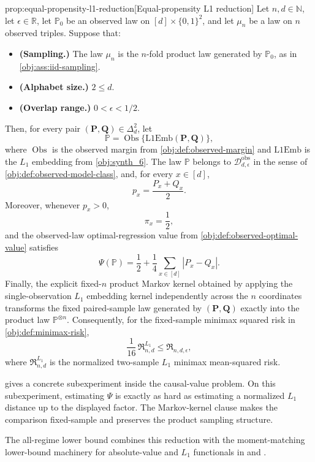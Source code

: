 \begin{propositionv}{prop:equal-propensity-l1-reduction}[Equal-propensity L1 reduction]
Let \(n,d\in\mathbb N\), let \(\epsilon\in\mathbb R\), let \(\mathbb P_0\) be an observed law on \([d]\times\{0,1\}^2\), and let \(\mu_n\) be a law on \(n\) observed triples. Suppose that:
\begin{itemize}
\item \textbf{(Sampling.)} The law \(\mu_n\) is the \(n\)-fold product law generated by \(\mathbb P_0\), as in \cref{obj:ass:iid-sampling}.
\item \textbf{(Alphabet size.)} \(2\le d\).
\item \textbf{(Overlap range.)} \(0<\epsilon<1/2\).
\end{itemize}
Then, for every pair \((\mathbf P,\mathbf Q)\in\Delta_d^2\), let
\[
\mathbb P=\operatorname{Obs}\{\mathrm{L1Emb}(\mathbf P,\mathbf Q)\},
\]
where \(\operatorname{Obs}\) is the observed margin from \cref{obj:def:observed-margin} and \(\mathrm{L1Emb}\) is the \(L_1\) embedding from \cref{obj:synth_6}. The law \(\mathbb P\) belongs to \(\mathcal D_{d,\epsilon}^{\mathrm{obs}}\) in the sense of \cref{obj:def:observed-model-class}, and, for every \(x\in[d]\),
\[
p_x=\frac{P_x+Q_x}{2}.
\]
Moreover, whenever \(p_x>0\),
\[
\pi_x=\frac12,
\]
and the observed-law optimal-regression value from \cref{obj:def:observed-optimal-value} satisfies
\[
\Psi(\mathbb P)=\frac12+\frac14\sum_{x\in[d]} |P_x-Q_x|.
\]
Finally, the explicit fixed-\(n\) product Markov kernel obtained by applying the single-observation \(L_1\) embedding kernel independently across the \(n\) coordinates transforms the fixed paired-sample law generated by \((\mathbf P,\mathbf Q)\) exactly into the product law \(\mathbb P^{\otimes n}\). Consequently, for the fixed-sample minimax squared risk in \cref{obj:def:minimax-risk},
\[
\frac{1}{16}\,\mathfrak R^{L_1}_{n,d}\le \mathfrak R_{n,d,\epsilon},
\]
where \(\mathfrak R^{L_1}_{n,d}\) is the normalized two-sample \(L_1\) minimax mean-squared risk.
\end{propositionv}

 gives a concrete subexperiment inside the causal-value problem. On this subexperiment, estimating \(\Psi\) is exactly as hard as estimating a normalized \(L_1\) distance up to the displayed factor. The Markov-kernel clause makes the comparison fixed-sample and preserves the product sampling structure.

The all-regime lower bound combines this reduction with the moment-matching lower-bound machinery for absolute-value and \(L_1\) functionals in \citet[Lemma 1 and Section 3.1]{CaiLow2011L1} and \citet[Theorem 3 and equation (24)]{JiaoHanWeissman2018L1}.

